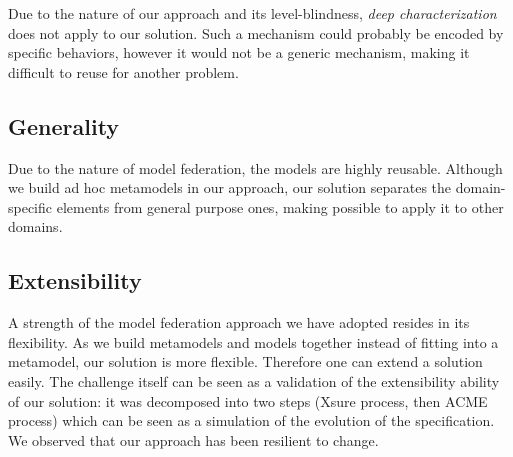 
  Due to the nature of our approach and its level-blindness, \emph{deep characterization} does not 
  apply to our solution. Such a mechanism could probably be encoded by specific behaviors, however 
  it would not be a generic mechanism, making it difficult to reuse for another problem.

  \subsection{Generality}


  Due to the nature of model federation, the models are highly reusable.
  Although we build ad hoc metamodels in our approach, our solution separates
  the domain-specific elements from general purpose ones, making possible to 
  apply it to other domains. 

  \subsection{Extensibility}


  A strength of the  model federation approach we have adopted resides in its
  flexibility. As we build metamodels and models together instead of fitting
  into a metamodel, our solution is more flexible. Therefore one can extend a
  solution easily. The challenge itself can be seen as a validation of the
  extensibility ability of our solution: it was decomposed into two steps
  (Xsure process, then ACME process) which can be seen as a simulation of the
  evolution of the  specification. We observed that our approach has been
  resilient to change.

